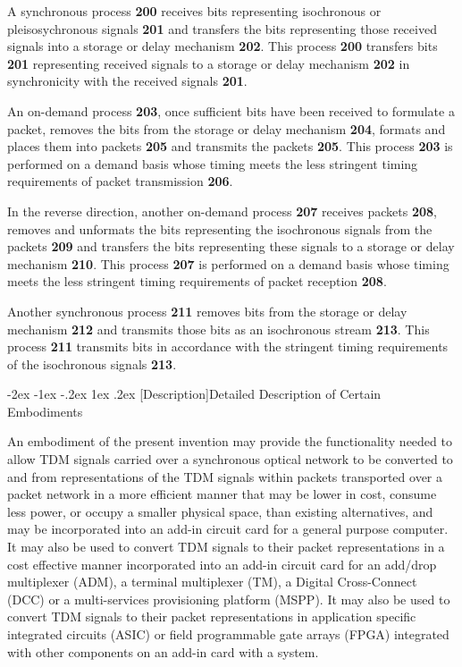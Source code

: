 \documentclass[letterpaper,final,notitlepage,twocolumn,10pt,twoside]{article}
\makeatletter
\let\large = \normalsize
\let\normalsize = \small
\let\small = \footnotesize
\let\footnotesize = \scriptsize
\let\scriptsize = \tiny
\renewcommand\section{\@startsection {section}{1}{\z@}%
                                   {-2ex \@plus -1ex \@minus -.2ex}%
                                   {1ex \@plus .2ex}%
                                   {\normalfont\large\bfseries}}
\makeatother
\begin{document}
A synchronous process \textbf{200} receives bits representing isochronous or
pleisosychronous signals \textbf{201} and transfers the bits representing those
received signals into a storage or delay mechanism \textbf{202}.  This process
\textbf{200} transfers bits \textbf{201} representing received signals to a
storage or delay mechanism \textbf{202} in synchronicity with the received
signals \textbf{201}.

An on-demand process \textbf{203}, once sufficient bits have been received to
formulate a packet, removes the bits from the storage or delay mechanism
\textbf{204}, formats and places them into packets \textbf{205} and transmits
the packets \textbf{205}.  This process \textbf{203} is performed on a demand
basis whose timing meets the less stringent timing requirements of packet
transmission \textbf{206}.

In the reverse direction, another on-demand process \textbf{207} receives
packets \textbf{208}, removes and unformats the bits representing the
isochronous signals from the packets \textbf{209} and transfers the bits
representing these signals to a storage or delay mechanism \textbf{210}.  This
process \textbf{207} is performed on a demand basis whose timing meets the less
stringent timing requirements of packet reception \textbf{208}.

Another synchronous process \textbf{211} removes bits from the storage or delay
mechanism \textbf{212} and transmits those bits as an isochronous stream
\textbf{213}.  This process \textbf{211} transmits bits in accordance with the
stringent timing requirements of the isochronous signals \textbf{213}.

\section[Description]{Detailed Description of Certain Embodiments}

An embodiment of the present invention may provide the functionality needed to
allow TDM signals carried over a synchronous optical network to be converted
to and from representations of the TDM signals within packets transported over
a packet network in a more efficient manner that may be lower in cost, consume
less power, or occupy a smaller physical space, than existing alternatives,
and may be incorporated into an add-in circuit card for a general purpose
computer.  It may also be used to convert TDM signals to their packet
representations in a cost effective manner incorporated into an add-in circuit
card for an add/drop multiplexer (ADM), a terminal multiplexer (TM), a Digital
Cross-Connect (DCC) or a multi-services provisioning platform (MSPP).  It may
also be used to convert TDM signals to their packet representations in
application specific integrated circuits (ASIC) or field programmable gate
arrays (FPGA) integrated with other components on an add-in card with a
system.
\end{document}
